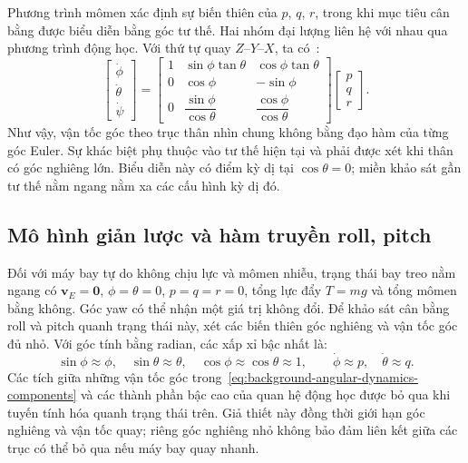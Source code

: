 Phương trình mômen xác định sự biến thiên của $p$, $q$, $r$, trong khi mục tiêu cân bằng được biểu diễn bằng góc tư thế. Hai nhóm đại lượng liên hệ với nhau qua phương trình động học. Với thứ tự quay $Z$--$Y$--$X$, ta có~\cite{chovancova2014mathematical}:
\begin{equation}
	\begin{bmatrix}\dot\phi\\\dot\theta\\\dot\psi\end{bmatrix}
	=\begin{bmatrix}
		1 & \sin\phi\tan\theta           & \cos\phi\tan\theta           \\
		0 & \cos\phi                     & -\sin\phi                    \\
		0 & \dfrac{\sin\phi}{\cos\theta} & \dfrac{\cos\phi}{\cos\theta}
	\end{bmatrix}
	\begin{bmatrix}p\\q\\r\end{bmatrix}.
	\label{eq:background-euler-rate-mapping}
\end{equation}
Như vậy, vận tốc góc theo trục thân nhìn chung không bằng đạo hàm của từng góc Euler. Sự khác biệt phụ thuộc vào tư thế hiện tại và phải được xét khi thân có góc nghiêng lớn. Biểu diễn này có điểm kỳ dị tại $\cos\theta=0$; miền khảo sát gần tư thế nằm ngang nằm xa các cấu hình kỳ dị đó.

\subsection{Mô hình giản lược và hàm truyền roll, pitch}

Đối với máy bay tự do không chịu lực và mômen nhiễu, trạng thái bay treo nằm ngang có $\symbf{v}_E=\symbf{0}$, $\phi=\theta=0$, $p=q=r=0$, tổng lực đẩy $T=mg$ và tổng mômen bằng không. Góc yaw có thể nhận một giá trị không đổi. Để khảo sát cân bằng roll và pitch quanh trạng thái này, xét các biến thiên góc nghiêng và vận tốc góc đủ nhỏ. Với góc tính bằng radian, các xấp xỉ bậc nhất là:
\begin{equation}
	\sin\phi\approx\phi,\quad \sin\theta\approx\theta,\quad
	\cos\phi\approx\cos\theta\approx1,\qquad
	\dot\phi\approx p,\quad\dot\theta\approx q.
	\label{eq:background-small-angle-kinematics}
\end{equation}
Các tích giữa những vận tốc góc trong~\eqref{eq:background-angular-dynamics-components} và các thành phần bậc cao của quan hệ động học được bỏ qua khi tuyến tính hóa quanh trạng thái trên. Giả thiết này đồng thời giới hạn góc nghiêng và vận tốc quay; riêng góc nghiêng nhỏ không bảo đảm liên kết giữa các trục có thể bỏ qua nếu máy bay quay nhanh.


